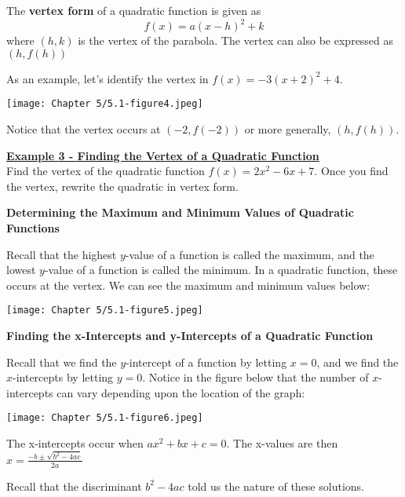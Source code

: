 \documentclass[12pt]{book}
\newcommand{\D}{\displaystyle}
\begin{document}
\begin{boxR}
    The \textbf{vertex form} of a quadratic function is given as 
    $$ f(x)= a(x-h)^2 + k$$
    where $(h,k)$ is the vertex of the parabola. The vertex can also be expressed as $(h, f(h))$
\end{boxR}

As an example, let's identify the vertex in $f(x)=-3(x+2)^2+4$. 




{\hspace{-15mm} \texttt{[image: Chapter 5/5.1-figure4.jpeg]}}




Notice that the vertex occurs at $(-2, f(-2))$ or more generally, 
$(h, f(h))$.



\vspace{3mm}

\underline{\textbf{Example 3 - Finding the Vertex of a Quadratic Function}}
\\
Find the vertex of the quadratic function $f(x)=2x^2-6x+7$. Once you find the vertex, rewrite the quadratic in vertex form.

\newpage

{\large \textbf{Determining the Maximum and Minimum Values of Quadratic Functions}}

Recall that the highest $y$-value of a function is called the maximum, and the lowest $y$-value of a function is called the minimum. In a quadratic function, these occurs at the vertex. We can see the maximum and minimum values below:

\texttt{[image: Chapter 5/5.1-figure5.jpeg]}

\newpage

{\large \textbf{Finding the x-Intercepts and y-Intercepts of a Quadratic Function}}

Recall that we find the $y$-intercept of a function by letting $x=0$, and we find the  $x$-intercepts by letting $y=0$. Notice in the figure below that the number of  $x$-intercepts can vary depending upon the location of the graph:

\centerline{\texttt{[image: Chapter 5/5.1-figure6.jpeg]}}
\vspace{15mm}

The x-intercepts occur when $ax^2+bx+c=0$. The x-values are then $\D x = \frac{-b \pm \sqrt{b^2-4ac}}{2a}$


Recall that the discriminant $b^2-4ac$ told us the nature of these solutions.
\end{document}
